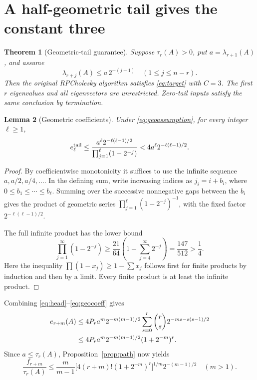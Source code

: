 \documentclass[11pt]{article}
\newtheorem{theorem}{Theorem}[section]
\newtheorem{lemma}[theorem]{Lemma}
\theoremstyle{remark}\newtheorem{remark}[theorem]{Remark}
\begin{document}
\section{A half-geometric tail gives the constant three}
\begin{theorem}[Geometric-tail guarantee]\label{thm:geo}
Suppose $\tau_r(A)>0$, put $a=\lambda_{r+1}(A)$, and assume
\begin{equation}
 \lambda_{r+j}(A)\le a\,2^{-(j-1)}
 \quad(1\le j\le n-r). \label{eq:geoassumption}
\end{equation}
Then the original RPCholesky algorithm satisfies \eqref{eq:target} with $C=3$. The first $r$ eigenvalues and all eigenvectors are unrestricted. Zero-tail inputs satisfy the same conclusion by termination.
\end{theorem}

\begin{lemma}[Geometric coefficients]\label{lem:geocoeff}
Under \eqref{eq:geoassumption}, for every integer $\ell\ge1$,
\begin{equation}
 e_\ell^{\rm tail}\le
 \frac{a^\ell 2^{-\ell(\ell-1)/2}}{\prod_{j=1}^\ell(1-2^{-j})}
 <4a^\ell2^{-\ell(\ell-1)/2}. \label{eq:geocoeff}
\end{equation}
\end{lemma}
\begin{proof}
By coefficientwise monotonicity it suffices to use the infinite sequence $a, a/2,a/4,\ldots$. In the defining sum, write increasing indices as $j_i=i+b_i$, where $0\le b_1\le\cdots\le b_\ell$. Summing over the successive nonnegative gaps between the $b_i$ gives the product of geometric series $\prod_{j=1}^\ell(1-2^{-j})^{-1}$, with the fixed factor $2^{-\ell(\ell-1)/2}$.

The full infinite product has the lower bound
\[
 \prod_{j=1}^\infty(1-2^{-j})
 \ge\frac{21}{64}\left(1-\sum_{j=4}^\infty2^{-j}\right)
 =\frac{147}{512}>\frac14.
\]
Here the inequality $\prod(1-x_j)\ge1-\sum x_j$ follows first for finite products by induction and then by a limit. Every finite product is at least the infinite product.
\end{proof}

Combining \eqref{eq:head}--\eqref{eq:geocoeff} gives
\begin{align}
 e_{r+m}(A)
 &\le4P_r a^m2^{-m(m-1)/2}
 \sum_{s=0}^r{r\choose s}2^{-ms-s(s-1)/2}\notag\\
 &\le4P_r a^m2^{-m(m-1)/2}(1+2^{-m})^r. \label{eq:geoek}
\end{align}
Since $a\le\tau_r(A)$, Proposition~\ref{prop:path} now yields
\begin{equation}
 \frac{f_{r+m}}{\tau_r(A)}
 \le\frac{m}{m-1}
 \bigl[4(r+m)!(1+2^{-m})^r\bigr]^{1/m}
 2^{-(m-1)/2}\quad(m>1). \label{eq:geomean}
\end{equation}
\end{document}
